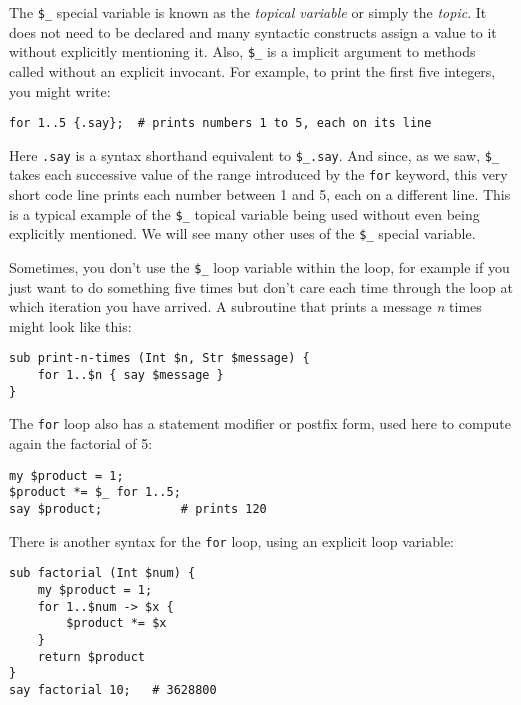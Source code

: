 The \verb"$_" special variable is known as the \emph{topical 
variable} or simply the \emph{topic}. It does not need to be declared 
and many syntactic constructs assign a value to it without 
explicitly mentioning it. Also, \verb"$_" is a implicit argument 
to methods called without an explicit invocant. For example, 
to print the first five integers, you might write:

\begin{verbatim}
for 1..5 {.say};  # prints numbers 1 to 5, each on its line
\end{verbatim} 

Here {\tt .say} is a syntax shorthand equivalent to \verb"$_.say". 
And since, as we saw, \verb"$_" takes each successive value of 
the range introduced by the {\tt for} keyword, this very short code 
line prints each number between 1 and 5, each on a different line. 
This is a typical example of the \verb"$_" topical variable being used 
without even being explicitly mentioned. We will see many other 
uses of the \verb"$_" special variable. 

Sometimes, you don't use the \verb"$_" loop variable within the 
loop, for example if you just want to do something five times but don't 
care each time through the loop at which iteration you 
have arrived. A subroutine that prints a message \emph{n} times 
might look like this:

\begin{verbatim}
sub print-n-times (Int $n, Str $message) {
    for 1..$n { say $message }
} 
\end{verbatim} 


The {\tt for} loop also has a statement modifier or postfix form, 
used here to compute again the factorial of 5:

\begin{verbatim}
my $product = 1;
$product *= $_ for 1..5;
say $product;           # prints 120
\end{verbatim} 

There is another syntax for the {\tt for} loop, using an explicit loop variable:

\begin{verbatim}
sub factorial (Int $num) { 
    my $product = 1;  
    for 1..$num -> $x { 
        $product *= $x
    }
    return $product
}
say factorial 10;   # 3628800
\end{verbatim} 

